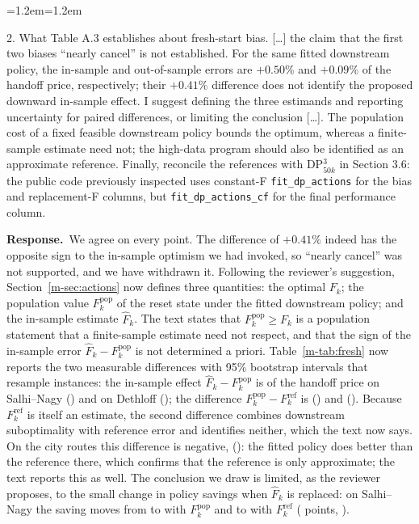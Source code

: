 \documentclass[11pt]{article}
\newenvironment{comment}{\par\medskip\noindent\color{rev}\itshape
  \begin{list}{}{\leftmargin=1.2em\rightmargin=1.2em}\item[]}%
  {\end{list}\par}
\newcommand{\resp}{\par\noindent\textbf{Response.}\ }
\newcommand{\sref}[1]{Section~\ref{m-#1}}
\newcommand{\tref}[1]{Table~\ref{m-#1}}
\begin{document}
\begin{comment}
2. What Table A.3 establishes about fresh-start bias. [\ldots] the claim
that the first two biases ``nearly cancel'' is not established. For the
same fitted downstream policy, the in-sample and out-of-sample errors are
$+0.50\%$ and $+0.09\%$ of the handoff price, respectively; their
$+0.41\%$ difference does not identify the proposed downward in-sample
effect. I suggest defining the three estimands and reporting uncertainty
for paired differences, or limiting the conclusion [\ldots]. The
population cost of a fixed feasible downstream policy bounds the
optimum, whereas a finite-sample estimate need not; the high-data program
should also be identified as an approximate reference. Finally,
reconcile the references with DP$^3_{50k}$ in Section 3.6: the public
code previously inspected uses constant-F \texttt{fit\_dp\_actions} for
the bias and replacement-F columns, but \texttt{fit\_dp\_actions\_cf} for
the final performance column.
\end{comment}
\resp We agree on every point. The difference of $+0.41\%$ indeed has the
opposite sign to the in-sample optimism we had invoked, so ``nearly
cancel'' was not supported, and we have withdrawn it. Following the
reviewer's suggestion, \sref{sec:actions} now defines three quantities:
the optimal $F_k$; the population value $F^{\mathrm{pop}}_k$ of the reset
state under the fitted downstream policy; and the in-sample estimate
$\widehat F_k$. The text states that $F^{\mathrm{pop}}_k \ge F_k$ is a
population statement that a finite-sample estimate need not respect, and
that the sign of the in-sample error $\widehat F_k - F^{\mathrm{pop}}_k$
is not determined a priori. \tref{tab:fresh} now reports the two
measurable differences with 95\% bootstrap intervals that resample
instances: the in-sample effect $\widehat F_k - F^{\mathrm{pop}}_k$ is
\frSalhiInEff{} of the handoff price on Salhi--Nagy (\frSalhiInEffCI) and
\frDethInEff{} on Dethloff (\frDethInEffCI); the difference
$F^{\mathrm{pop}}_k - F^{\mathrm{ref}}_k$ is \frSalhiDsEff{}
(\frSalhiDsEffCI) and \frDethDsEff{} (\frDethDsEffCI). Because
$F^{\mathrm{ref}}_k$ is itself an estimate, the second difference
combines downstream suboptimality with reference error and identifies
neither, which the text now says. On the city routes this difference
is negative, \frCityDsEff{} (\frCityDsEffCI): the fitted policy does
better than the reference there, which confirms that the reference is
only approximate; the text reports this as well. The conclusion we draw is limited, as
the reviewer proposes, to the small change in policy savings when
$\widehat F_k$ is replaced: on Salhi--Nagy the saving moves from
\frSalhiThree{} to \frSalhiFout{} with $F^{\mathrm{pop}}_k$ and to
\frSalhiFstar{} with $F^{\mathrm{ref}}_k$ (\frSalhiDeltaF{} points,
\frSalhiDeltaFCI).
\end{document}

